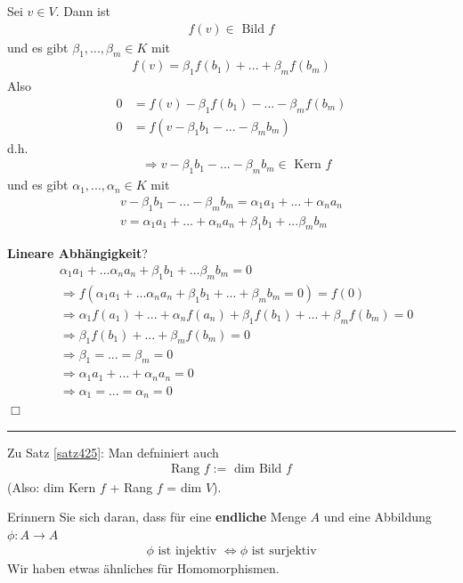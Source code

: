 \documentclass[11pt]{report}
\newcommand*\f[1] {\textbf{#1}}
\begin{document}
Sei $v \in V$. Dann ist
\begin{align}
 f(v) \in \text{ Bild } f 
\end{align}
und es gibt $\beta_1, ..., \beta_m \in K$ mit
\begin{align}
 f(v) = \beta_1 f(b_1) + ... + \beta_m f(b_m)
\end{align}
Also
\begin{align}
 0 &= f(v) - \beta_1 f(b_1) - ... - \beta_m f(b_m) \\
 0 &= f(v - \beta_1 b_1 - ... - \beta_m b_m)
\end{align}
d.h.
\begin{align}
 &\Rightarrow v - \beta_1 b_1 - ... - \beta_m b_m \in \text{ Kern } f
\end{align}
und es gibt $\alpha_1, ..., \alpha_n \in K$ mit
\begin{align}
  v - \beta_1 b_1 - ... - \beta_m b_m = \alpha_1 a_1 + ...  + \alpha_n a_n \\
 v = \alpha_1 a_1 +  ... + \alpha_n a_n + \beta_1 b_1 + ... \beta_m b_m
\end{align}

\f{Lineare Abhängigkeit}?
\begin{align}
 &\alpha_1 a_1 + ... \alpha_n a_n + \beta_1 b_1 + ... \beta_m b_m = 0 \\
 &\Rightarrow f(\alpha_1 a_1 + ... \alpha_n a_n + \beta_1 b_1 + ... + \beta_m b_m = 0) = f(0) \\
 &\Rightarrow \alpha_1 f(a_1) + ... + \alpha_n f(a_n) + \beta_1 f(b_1) + ... + \beta_m f(b_m) = 0 \\
 &\Rightarrow \beta_1 f(b_1) + ... + \beta_m f(b_m) = 0 \\
 &\Rightarrow \beta_1 = ... = \beta_m = 0 \\
 &\Rightarrow \alpha_1 a_1 + ... + \alpha_n a_n = 0\\
 &\Rightarrow \alpha_1 = ... = \alpha_n = 0
\end{align}
 \hspace*{1cm}\hfill $\Box$

\vspace*{0.2cm}\rule{\linewidth}{0.3mm}\vspace{0.2cm}
Zu Satz \ref{satz425}: Man defniniert auch
\begin{align}
 \text{Rang } f := \text{ dim Bild } f
\end{align}
(Also: dim Kern $f$ + Rang $f$ = dim $V$).

Erinnern Sie sich daran, dass für eine \f{endliche} Menge $A$ und eine Abbildung $\phi: A \rightarrow A$
\begin{align}
 \phi \text{ ist injektiv } \Leftrightarrow \phi \text{ ist surjektiv}
\end{align}
Wir haben etwas ähnliches für Homomorphismen.
\end{document}
